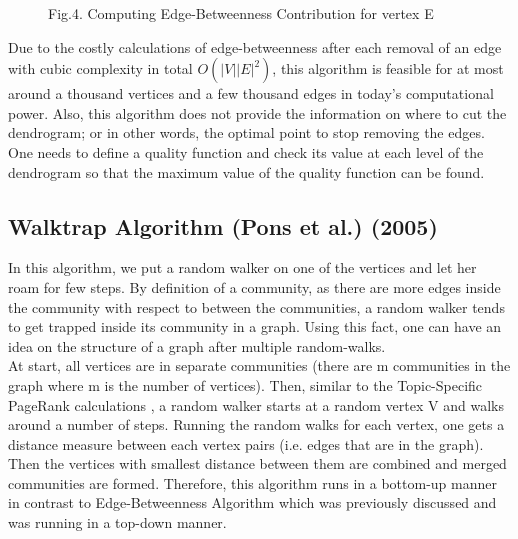 \documentclass[10pt]{article}
\begin{document}
\begin{figure}
    \caption{Fig.4. Computing Edge-Betweenness Contribution for vertex E}
    \label{fig:awesome_image}
\end{figure}


Due to the costly calculations of edge-betweenness after each removal of an edge with cubic complexity in total $O\left(|V||E|^2 \right)$, this algorithm is feasible for at most around a thousand vertices and a few thousand edges in today’s computational power. Also, this algorithm does not provide the information on where to cut the dendrogram; or in other words, the optimal point to stop removing the edges. One needs to define a quality function and check its value at each level of the dendrogram so that the maximum value of the quality function can be found. \\

\subsection{Walktrap Algorithm (Pons et al.) (2005)}

In this algorithm, we put a random walker on one of the vertices and let her roam for few steps. By definition of a community, as there are more edges inside the community with respect to between the communities, a random walker tends to get trapped inside its community in a graph. Using this fact, one can have an idea on the structure of a graph after multiple random-walks. \\

At start, all vertices are in separate communities (there are m communities in the graph where m is the number of vertices). Then, similar to the Topic-Specific PageRank calculations \cite{mmds}, a random walker starts at a random vertex V and walks around a number of steps. Running the random walks for each vertex, one gets a distance measure between each vertex pairs (i.e. edges that are in the graph)\cite{random}. Then the vertices with smallest distance between them are combined and merged communities are formed. Therefore, this algorithm runs in a bottom-up manner in contrast to Edge-Betweenness Algorithm which was previously discussed and was running in a top-down manner. \\
\end{document}
